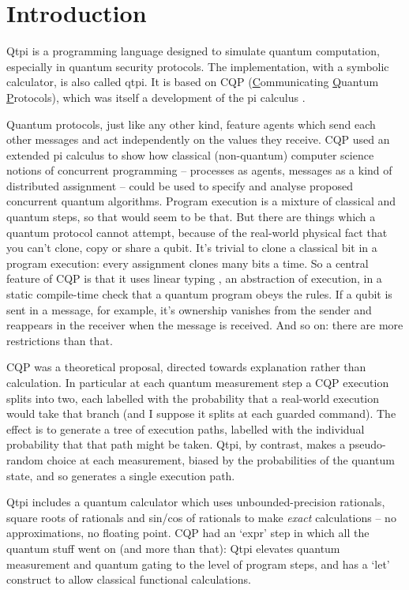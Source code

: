 
\chapter{Introduction}

Qtpi is a programming language designed to simulate quantum computation, especially in quantum security protocols. The implementation, with a symbolic calculator, is also called qtpi. It is based on CQP \citep{GaySJ:comqp} (\underline{C}ommunicating \underline{Q}uantum \underline{P}rotocols), which was itself a development of the pi calculus \citep{DBLP:journals/iandc/MilnerPW92a}. 

Quantum protocols, just like any other kind, feature agents which send each other messages and act independently on the values they receive. CQP used an extended pi calculus to show how classical (non-quantum) computer science notions of concurrent programming -- processes as agents, messages as a kind of distributed assignment -- could be used to specify and analyse proposed concurrent quantum algorithms. Program execution is a mixture of classical and quantum steps, so that would seem to be that. But there are things which a quantum protocol cannot attempt, because of the real-world physical fact that you can't clone, copy or share a qubit. It's trivial to clone a classical bit in a program execution: every assignment clones many bits a time. So a central feature of CQP is that it uses linear typing \citep{linearityandthepi-calculus}, an abstraction of execution, in a static compile-time check that a quantum program obeys the rules. If a qubit is sent in a message, for example, it's ownership vanishes from the sender and reappears in the receiver when the message is received. And so on: there are more restrictions than that.

CQP was a theoretical proposal, directed towards explanation rather than calculation. In particular at each quantum measurement step a CQP execution splits into two, each labelled with the probability that a real-world execution would take that branch (and I suppose it splits at each guarded command). The effect is to generate a tree of execution paths, labelled with the individual probability that that path might be taken. Qtpi, by contrast, makes a pseudo-random choice at each measurement, biased by the probabilities of the quantum state, and so generates a single execution path. 

Qtpi includes a quantum calculator which uses unbounded-precision rationals, square roots of rationals and sin/cos of rationals to make \emph{exact} calculations -- no approximations, no floating point. CQP had an `expr' step in which all the quantum stuff went on (and more than that): Qtpi elevates quantum measurement and quantum gating to the level of program steps, and has a `let' construct to allow classical functional calculations.


